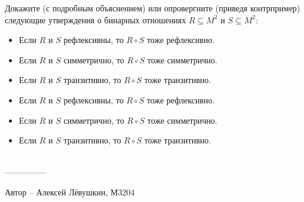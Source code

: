 \question
Докажите (с подробным объяснением) или опровергните (приведя контрпример) следующие утверждения о бинарных отношениях $R \subseteq M^2$ и $S \subseteq M^2$:
\begin{itemize}
    \item Если $R$ и $S$ рефлексивны, то $R \circ S$ тоже рефлексивно.
    \item Если $R$ и $S$ симметрично, то $R \circ S$ тоже симметрично.
    \item Если $R$ и $S$ транзитивно, то $R \circ S$ тоже транзитивно.
    \item Если $R$ и $S$ рефлексивны, то $R \circ S$ тоже рефлексивно.
    \item Если $R$ и $S$ симметрично, то $R \circ S$ тоже симметрично.
    \item Если $R$ и $S$ транзитивно, то $R \circ S$ тоже транзитивно.
\end{itemize}
\\
---------------

Автор -- Алексей Лёвушкин, М3204